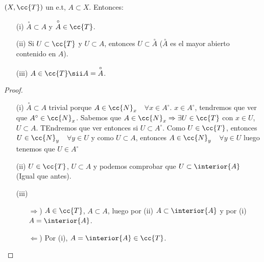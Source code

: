 \begin{propiedades}$(X, \cc{T})$ un e.t, $A\subset X$. Entonces:
    \begin{enumerate}
        \item[(i)] $\overset{\circ}{A} \subset A$ y $\overset{\circ}{A} \in \cc{T}$.
        \item[(ii)] Si $U \subset \cc{T}$ y $U \subset A$, entonces $U \subset \overset{\circ}{A}$ ($\overset{\circ}{A}$ es el mayor abierto contenido en $A$).
        \item[(iii)] $A\in \cc{T} \sii A = \overset{\circ}{A}$. 
    \end{enumerate}

    \begin{proof}\
        \begin{itemize}
            \item[(i)] $\overset{\circ}{A}\subset A$ trivial porque $A \in \cc{N}_x$\ \ $\forall x \in A^\circ$. $x\in A^\circ$, tendremos que ver que $A^\circ\in \cc{N}_x$. Sabemos que $A\in \cc{N}_x \Rightarrow \exists U \in \cc{T}$ con $x\in U$, $U\subset A$. TEndremos que ver entonces si $U\subset A^\circ$. Como $U\in \cc{T}$, entonces $U\in \cc{N}_y$\ \ $\forall y \in U$ y como $U\subset A$, entonces $A\in \cc{N}_y$\ \ $\forall y \in U$ luego tenemos que $U \in A^\circ$
            \item[(ii)] $U \in \cc{T}$, $U\subset A$ y podemos comprobar que $U\subset \interior{A}$ (Igual que antes).
            \item[(iii)] \begin{itemize}
                \item[$\Rightarrow$)] $A\in \cc{T}$, $A\subset A$, luego por (ii) $A\subset \interior{A}$ y por (i) $A=\interior{A}$.
                \item[$\Leftarrow$)] Por (i), $A=\interior{A}\in \cc{T}$. 
            \end{itemize}  
        \end{itemize}
    \end{proof}
    
\end{propiedades}

